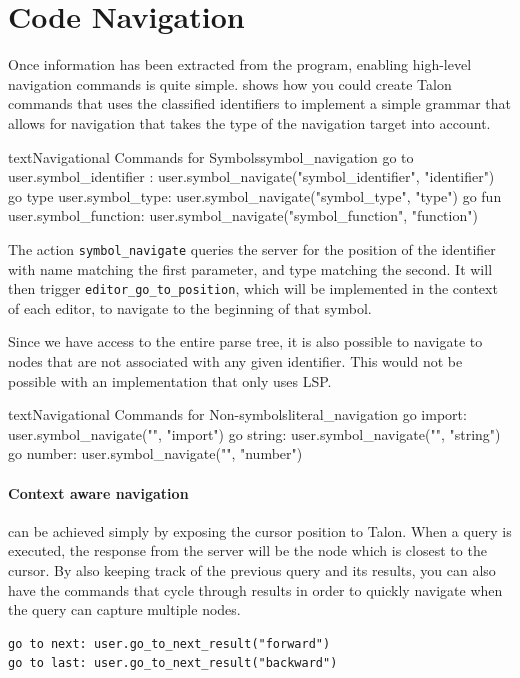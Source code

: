 \documentclass[../thesis.tex]{subfiles}
\begin{document}
\section{Code Navigation}%
\label{sec:code_navigation}
Once information has been extracted from the program, enabling high-level navigation commands is quite simple.
 shows how you could create Talon commands that uses the classified identifiers
to implement a simple grammar that allows for navigation that takes the type of the navigation target
into account.
\begin{code}{text}{Navigational Commands for Symbols}{symbol_navigation}
go to { user.symbol_identifier }:
    user.symbol_navigate("{symbol_identifier}", "identifier")
go type {user.symbol_type}:
    user.symbol_navigate("{symbol_type}", "type")
go fun {user.symbol_function}:
    user.symbol_navigate("{symbol_function}", "function")
\end{code}
The action \texttt{symbol\_navigate} queries the server
for the position of the identifier with name matching the first parameter, and type matching the second.
It will then trigger \texttt{editor\_go\_to\_position}, which will be implemented in the context of each editor,
to navigate to the beginning of that symbol.

Since we have access to the entire parse tree, it is also possible to navigate to nodes that
are not associated with any given identifier.
This would not be possible with an implementation that only uses LSP.
\begin{code}{text}{Navigational Commands for Non-symbols}{literal_navigation}
go import: user.symbol_navigate("", "import")
go string: user.symbol_navigate("", "string")
go number: user.symbol_navigate("", "number")
\end{code}

\paragraph{Context aware navigation}
can be achieved simply by exposing the cursor position to Talon.
When a query is executed, the response from the server will be the node
which is closest to the cursor. By also keeping track of
the previous query and its results, you can also have
the commands that cycle through results in order to quickly navigate
when the query can capture multiple nodes.
\begin{verbatim}
go to next: user.go_to_next_result("forward")
go to last: user.go_to_next_result("backward")
\end{verbatim}
\end{document}
